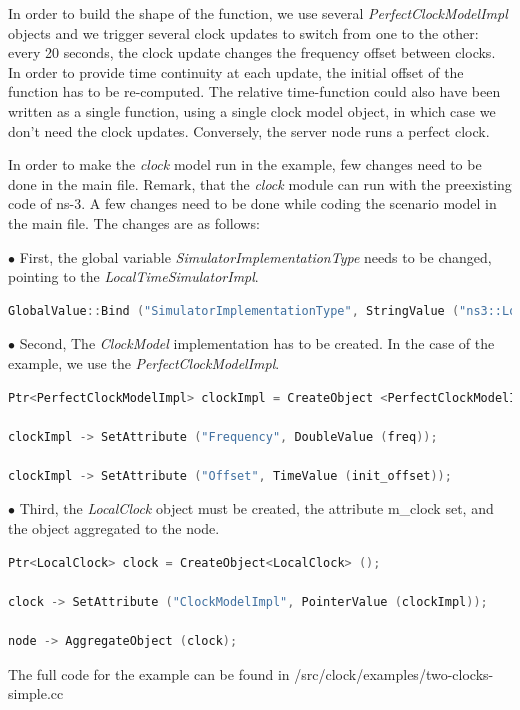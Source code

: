\documentclass[times, twoside, watermark]{zHenriquesLab-StyleBioRxiv}
\begin{document}
In order to build the shape of the function, we use several \textit{PerfectClockModelImpl} objects and we trigger several clock updates to switch from one to the other: every 20 seconds, the clock update changes the frequency offset between clocks. In order to provide time continuity at each update, the initial offset of the function has to be re-computed. 
The relative time-function could also have been written as a single function, using a single clock model object, in which case we don't need the clock updates. 
Conversely, the server node runs a perfect clock. 

In order to make the \textit{clock} model run in the example, few changes need to be done in the main file. Remark, that the \textit{clock} module can run with the preexisting code of ns-3. A few changes need to be done while coding the scenario model in the main file. The changes are as follows:

$\bullet$ First, the global variable \textit{SimulatorImplementationType} needs to be changed, pointing to the \textit{LocalTimeSimulatorImpl}.
\begin{lstlisting}[language=C++]
    GlobalValue::Bind ("SimulatorImplementationType", StringValue ("ns3::LocalTimeSimulatorImpl"));
\end{lstlisting}
  
$\bullet$ Second, The \textit{ClockModel} implementation has to be created. In the case of the example, we use the \textit{PerfectClockModelImpl}.
\begin{lstlisting}[language=C++]
Ptr<PerfectClockModelImpl> clockImpl = CreateObject <PerfectClockModelImpl> ();

clockImpl -> SetAttribute ("Frequency", DoubleValue (freq));

clockImpl -> SetAttribute ("Offset", TimeValue (init_offset));

\end{lstlisting}
$\bullet$ Third, the \textit{LocalClock} object must be created,  the attribute m\_clock set, and the object aggregated to the node. 
\begin{lstlisting}[language=C++]
Ptr<LocalClock> clock = CreateObject<LocalClock> ();

clock -> SetAttribute ("ClockModelImpl", PointerValue (clockImpl));

node -> AggregateObject (clock);

\end{lstlisting}

The full code for the example can be found in /src/clock/examples/two-clocks-simple.cc 
\end{document}
